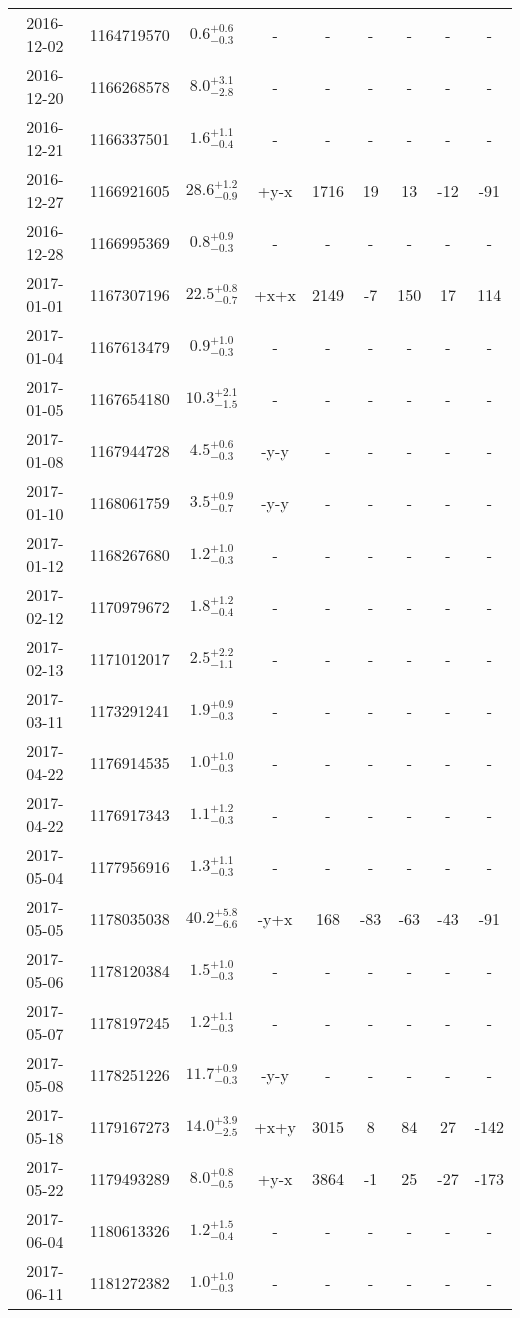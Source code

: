 \begin{longtable}{|c|c|c|c|c|c|c|c|c|}
	2016-12-02 & 1164719570 & $ 0.6^{+0.6}_{-0.3}$ & - & - & - & - & - & - \\
	2016-12-20 & 1166268578 & $ 8.0^{+3.1}_{-2.8}$ & - & - & - & - & - & - \\
	2016-12-21 & 1166337501 & $ 1.6^{+1.1}_{-0.4}$ & - & - & - & - & - & - \\
	2016-12-27 & 1166921605 & $28.6^{+1.2}_{-0.9}$ & +y-x & 1716 & 19 & 13 & -12 & -91 \\
	2016-12-28 & 1166995369 & $ 0.8^{+0.9}_{-0.3}$ & - & - & - & - & - & - \\
	2017-01-01 & 1167307196 & $22.5^{+0.8}_{-0.7}$ & +x+x & 2149 & -7 & 150 & 17 & 114 \\
	2017-01-04 & 1167613479 & $ 0.9^{+1.0}_{-0.3}$ & - & - & - & - & - & - \\
	2017-01-05 & 1167654180 & $10.3^{+2.1}_{-1.5}$ & - & - & - & - & - & - \\
	2017-01-08 & 1167944728 & $ 4.5^{+0.6}_{-0.3}$ & -y-y & - & - & - & - & - \\
	2017-01-10 & 1168061759 & $ 3.5^{+0.9}_{-0.7}$ & -y-y & - & - & - & - & - \\
	2017-01-12 & 1168267680 & $ 1.2^{+1.0}_{-0.3}$ & - & - & - & - & - & - \\
	2017-02-12 & 1170979672 & $ 1.8^{+1.2}_{-0.4}$ & - & - & - & - & - & - \\
	2017-02-13 & 1171012017 & $ 2.5^{+2.2}_{-1.1}$ & - & - & - & - & - & - \\
	2017-03-11 & 1173291241 & $ 1.9^{+0.9}_{-0.3}$ & - & - & - & - & - & - \\
	2017-04-22 & 1176914535 & $ 1.0^{+1.0}_{-0.3}$ & - & - & - & - & - & - \\
	2017-04-22 & 1176917343 & $ 1.1^{+1.2}_{-0.3}$ & - & - & - & - & - & - \\
	2017-05-04 & 1177956916 & $ 1.3^{+1.1}_{-0.3}$ & - & - & - & - & - & - \\
	2017-05-05 & 1178035038 & $40.2^{+5.8}_{-6.6}$ & -y+x & 168 & -83 & -63 & -43 & -91 \\
	2017-05-06 & 1178120384 & $ 1.5^{+1.0}_{-0.3}$ & - & - & - & - & - & - \\
	2017-05-07 & 1178197245 & $ 1.2^{+1.1}_{-0.3}$ & - & - & - & - & - & - \\
	2017-05-08 & 1178251226 & $11.7^{+0.9}_{-0.3}$ & -y-y & - & - & - & - & - \\
	2017-05-18 & 1179167273 & $14.0^{+3.9}_{-2.5}$ & +x+y & 3015 & 8 & 84 & 27 & -142 \\
	2017-05-22 & 1179493289 & $ 8.0^{+0.8}_{-0.5}$ & +y-x & 3864 & -1 & 25 & -27 & -173 \\
	2017-06-04 & 1180613326 & $ 1.2^{+1.5}_{-0.4}$ & - & - & - & - & - & - \\
	2017-06-11 & 1181272382 & $ 1.0^{+1.0}_{-0.3}$ & - & - & - & - & - & - \\
	\hline
\end{longtable} 
\endgroup